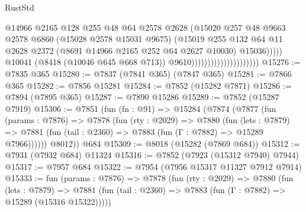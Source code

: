\begin{lexlean}{RustStd}
\begin{coremodule}
                                                    @14966
                                                    @2165
                                                    @128
                                                    @255
                                                    @48
                                                    @64
                                                    @2578
                                                    @2628
                                                    (@15020
                                                      @257
                                                      @48
                                                      @9663
                                                      @2578
                                                      @6860
                                                      (@15028 @2578 @15031 @9675)
                                                      (@15019
                                                        @255
                                                        @132
                                                        @64
                                                        @11
                                                        @2628
                                                        @2372
                                                        (@8691 @14966 @2165 @252 @64 @2627 @10030)
                                                        @15036)))))
                                              @10041
                                              (@8418 (@10046 @645 @668 @713))
                                              @9610)))))))))))))))))))))
@15276 := @7835 @365
@15280 := @7837 (@7841 @365) (@7847 @365)
@15281 := @7866 @365
@15282 := @7856 @15281
@15284 := @7852 (@15282 @7871)
@15286 := @7894 (@7895 @365)
@15287 := @7890 @15286
@15289 := @7852 (@15287 @7919)
@15306 := @7851
    (fun (fn : @91) =>
    @15284
      (@7874
        (@7877
          (fun (params : @7876) =>
          @7878
            (fun (rty : @2029) =>
            @7880
              (fun (lets : @7879) =>
              @7881 (fun (tail : @2360) => @7883 (fun (Γ : @7882) => @15289 @7966))))))
        @8012))
    @684
@15309 := @8018 (@15282 (@7869 @684))
@15312 := @7931 (@7932 @684) @11324
@15316 := @7852 (@7923 (@15312 @7940) @7944)
@15317 := @7957 @684
@15322 := @7954 (@7956 @15317 @11327 @7912 @7914)
@15333 := fun (params : @7876) =>
  @7878
    (fun (rty : @2029) =>
    @7880
      (fun (lets : @7879) =>
      @7881 (fun (tail : @2360) => @7883 (fun (Γ : @7882) => @15289 (@15316 @15322)))))

\end{coremodule}
\end{lexlean}
